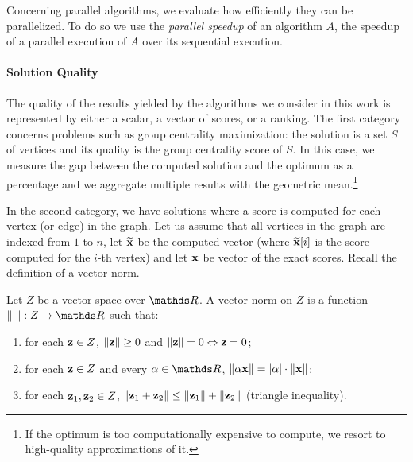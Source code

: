 Concerning parallel algorithms, we evaluate how efficiently they can be
parallelized. To do so we use the \emph{parallel speedup} of an algorithm $A$,
\ie the speedup of a parallel execution of $A$ over its sequential execution.

\paragraph{Solution Quality}
%
The quality of the results yielded by the algorithms we consider in this work is
represented by either a scalar, a vector of scores, or a ranking.
The first category concerns problems such as group centrality maximization:
the solution is a set $S$ of vertices and its quality is the group centrality
score of $S$.
In this case, we measure the gap between the computed solution and the optimum
as a percentage and we aggregate multiple results with the geometric
mean.\footnote{If the optimum is too computationally expensive to compute, we
resort to high-quality approximations of it.}

In the second category, we have solutions where a score is computed for each vertex
(or edge) in the graph. Let us assume that all vertices in the graph are
indexed from $1$ to $n$, let $\widetilde{\mathbf{x}}$ be the computed vector (where
$\widetilde{\mathbf{x}}[i]$ is the score computed for the $i$-th vertex) and let
$\mathbf{x}$ be vector of the exact scores. Recall the definition of a vector
norm.

\begin{definition}
Let $Z$ be a vector space over $\real$. A vector norm on $Z$ is a function
$\norm{\cdot} : Z \to \real$ such that:
\begin{enumerate}
    \item for each $\mathbf{z}\in Z$, $\norm{\vect{z}} \ge 0$ and $\norm{\vect{z}} = 0
        \Leftrightarrow \vect{z} = 0$;

    \item for each $\mathbf{z} \in Z$ and every $\alpha\in\real$, $\norm{\alpha \vect{x}}
        = |\alpha|\cdot\norm{\vect{x}}$;

    \item for each $\mathbf{z}_1, \mathbf{z}_2\in Z$, $\norm{\vect{z}_1 + \vect{z}_2} \le
        \norm{\vect{z}_1} + \norm{\vect{z}_2}$ (triangle inequality).

\end{enumerate}
\end{definition}

